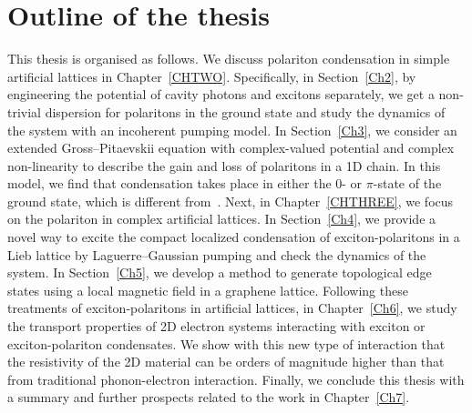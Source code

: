\section{Outline of the thesis}
This thesis is organised as follows.
We discuss polariton condensation in simple artificial lattices in Chapter~\ref{CHTWO}.
Specifically, in Section~\ref{Ch2}, by engineering the potential of cavity photons and excitons separately, we get a non-trivial dispersion for polaritons in the ground state and study the dynamics of the system with an incoherent pumping model.
In Section~\ref{Ch3}, we consider an extended Gross--Pitaevskii equation with complex-valued potential and complex non-linearity to describe the gain and loss of polaritons in a 1D chain.
In this model, we find that condensation takes place in either the $0$- or $\pi$-state of the ground state, which is different from~\cite{Lai:2007aa}.
Next, in Chapter~\ref{CHTHREE}, we focus on the polariton in complex artificial lattices.
In Section~\ref{Ch4}, we provide a novel way to excite the compact localized condensation of exciton-polaritons in a Lieb lattice by Laguerre--Gaussian pumping and check the dynamics of the system.
In Section~\ref{Ch5}, we develop a method to generate topological edge states using a local magnetic field in a graphene lattice.
Following these treatments of exciton-polaritons in artificial lattices, in Chapter~\ref{Ch6}, we study the transport properties of 2D electron systems interacting with exciton or exciton-polariton condensates.
We show with this new type of interaction that the resistivity of the 2D material can be orders of magnitude higher than that from traditional phonon-electron interaction.
Finally, we conclude this thesis with a summary and further prospects related to the work in Chapter~\ref{Ch7}.
